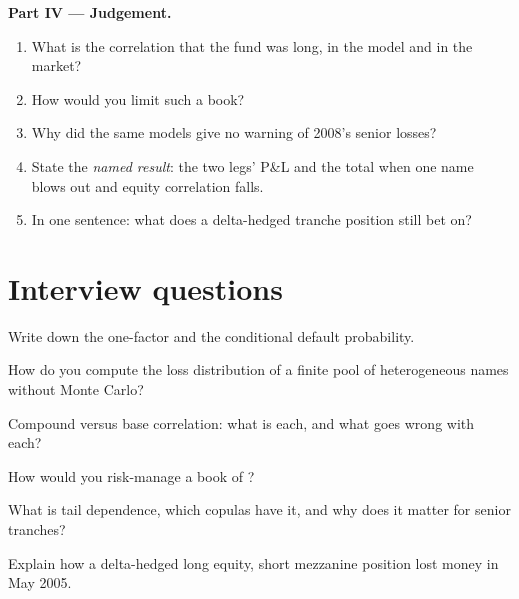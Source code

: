\begin{problem}
\medskip\noindent\textbf{Part IV --- Judgement.}
\begin{enumerate}[resume]
\item What is the correlation that the fund was long, in the model and in the market?
\item How would you limit such a book?
\item Why did the same models give no warning of 2008's senior losses?
\item State the \emph{named result}: the two legs' P\&L and the total when one name blows
out and equity correlation falls.
\item In one sentence: what does a delta-hedged tranche position still bet on?
\end{enumerate}
\end{problem}

\section{Interview questions}

\begin{interviewq}\label{iq:rc:portfolio-credit:1}
Write down the one-factor  and the conditional default probability.
\end{interviewq}

\begin{interviewq}\label{iq:rc:portfolio-credit:2}
How do you compute the loss distribution of a finite pool of heterogeneous names
without Monte Carlo?
\end{interviewq}

\begin{interviewq}\label{iq:rc:portfolio-credit:3}
Compound versus base correlation: what is each, and what goes wrong with each?
\end{interviewq}

\begin{interviewq}\label{iq:rc:portfolio-credit:4}
How would you risk-manage a book of ?
\end{interviewq}

\begin{interviewq}\label{iq:rc:portfolio-credit:5}
What is tail dependence, which copulas have it, and why does it matter for senior
tranches?
\end{interviewq}

\begin{interviewq}\label{iq:rc:portfolio-credit:6}
Explain how a delta-hedged long equity, short mezzanine position lost money in May 2005.
\end{interviewq}
